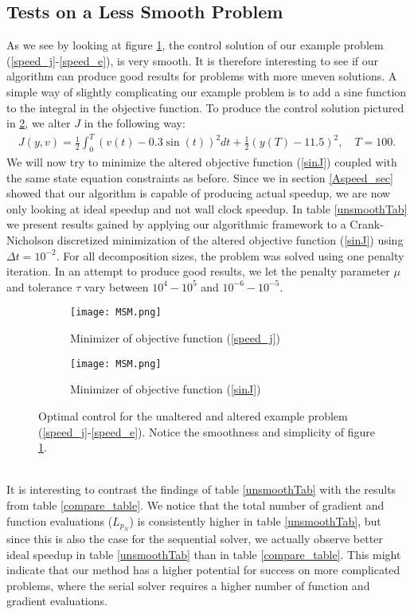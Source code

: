 \subsection{Tests on a Less Smooth Problem}
As we see by looking at figure \ref{smootha}, the control solution of our example problem (\ref{speed_j}-\ref{speed_e}), is very smooth. It is therefore interesting to see if our algorithm can produce good results for problems with more uneven solutions. A simple way of slightly complicating our example problem is to add a sine function to the integral in the objective function. To produce the control solution pictured in \ref{smoothb}, we alter $J$ in the following way:
\begin{align}
J(y,v) = \frac{1}{2}\int_0^{T}(v(t)-0.3\sin(t))^2dt + \frac{1}{2}(y(T)-11.5)^2, \quad T=100. \label{sinJ}
\end{align}
We will now try to minimize the altered objective function (\ref{sinJ}) coupled with the same state equation constraints as before. Since we in section \ref{Aspeed_sec} showed that our algorithm is capable of producing actual speedup, we are now only looking at ideal speedup and not wall clock speedup. In table \ref{unsmoothTab} we present results gained by applying our algorithmic framework to a Crank-Nicholson discretized minimization of the altered objective function (\ref{sinJ}) using $\Delta t = 10^{-2}$. For all decomposition sizes, the problem was solved using one penalty iteration. In an attempt to produce good results, we let the penalty parameter $\mu$ and tolerance $\tau$ vary between $10^4-10^5$ and $10^{-6}-10^{-5}$.
\\
\begin{figure}[h]
\centering
\begin{subfigure}{.5\textwidth}
  \centering
  \texttt{[image: MSM.png]}
  \caption{Minimizer of objective function (\ref{speed_j})}
  \label{smootha}
\end{subfigure}%
\begin{subfigure}{.5\textwidth}
  \centering
  \texttt{[image: MSM.png]}
  \caption{Minimizer of objective function (\ref{sinJ})}
  \label{smoothb}
\end{subfigure}
\caption{Optimal control for the unaltered and altered example problem (\ref{speed_j}-\ref{speed_e}). Notice the smoothness and simplicity of figure \ref{smootha}.}
\label{smooth}
\end{figure}
\\
It is interesting to contrast the findings of table \ref{unsmoothTab} with the results from table \ref{compare_table}. We notice that the total number of gradient and function evaluations ($L_{p_N}$) is consistently higher in table \ref{unsmoothTab}, but since this is also the case for the sequential solver, we actually observe better ideal speedup in table \ref{unsmoothTab} than in table \ref{compare_table}. This might indicate that our method has a higher potential for success on more complicated problems, where the serial solver requires a higher number of function and gradient evaluations.
